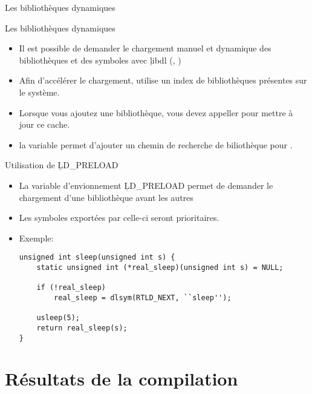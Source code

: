 \begin{frame}[fragile=singleslide]{Les bibliothèques dynamiques}
  \begin{center}
  \end{center}
\end{frame}

\begin{frame}[fragile=singleslide]{Les bibliothèques dynamiques}
  \begin{itemize}
  \item Il est possible de  demander le chargement manuel et dynamique
    des    bibliothèques    et    des    symboles    avec    \c{libdl}
    (, )
  \item Afin d'accélérer le  chargement,  utilise un index
    de bibliothèques présentes sur le système.
  \item  Lorsque vous  ajoutez une  bibliothèque, vous  devez appeller
     pour mettre à jour ce cache.
  \item la  variable  permet  d'ajouter un chemin
    de recherche de biliothèque pour .
  \end{itemize}
\end{frame}

\begin{frame}[fragile=singleslide]{Utilisation de \c{LD_PRELOAD}}
  \begin{itemize}
  \item La  variable d'envionnement \c{LD_PRELOAD}  permet de demander
    le chargement d'une bibliothèque avant les autres
  \item Les symboles exportées par celle-ci seront prioritaires.
  \item Exemple:
    \begin{lstlisting}
unsigned int sleep(unsigned int s) {
    static unsigned int (*real_sleep)(unsigned int s) = NULL;

    if (!real_sleep)
        real_sleep = dlsym(RTLD_NEXT, ``sleep'');

    usleep(5);
    return real_sleep(s);
}
    \end{lstlisting}
  \end{itemize}
\end{frame}

\section{Résultats de la compilation}


